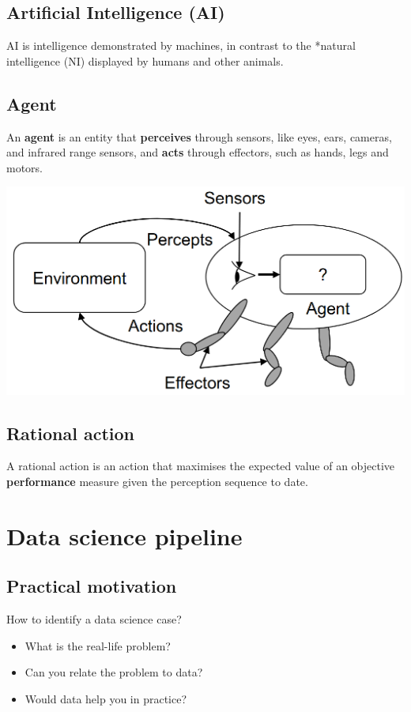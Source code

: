 \documentclass[11pt]{article}
\begin{document}
\subsection{Artificial Intelligence (AI)}
\label{sec:orgbb3cd1a}
AI is intelligence demonstrated by machines, in contrast to the *natural intelligence (NI) displayed by humans and other animals.
\subsection{Agent}
\label{sec:orgc0b5ed2}
An \textbf{agent} is an entity that \textbf{perceives} through sensors, like eyes, ears, cameras, and infrared range sensors, and \textbf{acts} through effectors, such as hands, legs and motors.

\begin{center}
\includegraphics[width=.9\linewidth]{./images/agent-diagram.png}
\end{center}
\subsection{Rational action}
\label{sec:org46fe313}
A rational action is an action that maximises the expected value of an objective \textbf{performance} measure given the perception sequence to date.

 \newpage
\section{Data science pipeline}
\label{sec:orgd6aea0b}

\subsection{Practical motivation}
\label{sec:org649604e}
How to identify a data science case?
\begin{itemize}
\item What is the real-life problem?
\item Can you relate the problem to data?
\item Would data help you in practice?
\end{itemize}
\end{document}
